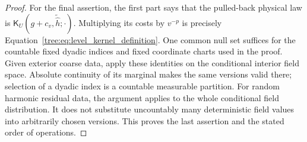 \begin{proof}
For the final assertion, the first part says that the pulled-back
physical law is $\mathsf K_U(g+c_v,\widetilde{\widehat h};\cdot)$.
Multiplying its costs by $v^{-p}$ is precisely
Equation~\eqref{tree:eq:level_kernel_definition}.  One common null set
suffices for the countable fixed dyadic indices and fixed coordinate
charts used in the proof.  Given exterior coarse data, apply these
identities on the conditional interior field space.  Absolute
continuity of its marginal makes the same versions valid there;
selection of a dyadic index is a countable measurable partition.
For random harmonic residual data, the argument applies to the
whole conditional field distribution.  It does not substitute
uncountably many deterministic field values into arbitrarily
chosen versions.  This proves the last assertion and the stated
order of operations.
\end{proof}


